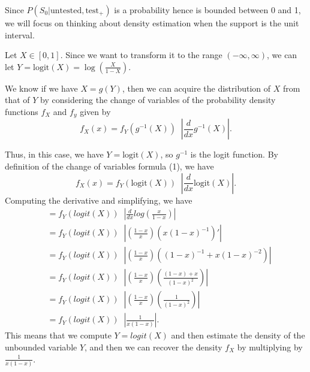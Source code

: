 \documentclass[12pt,twoside]{smiththesis}
\begin{document}
Since \(P(S_0|\text{untested}, \text{test}_+)\) is a probability hence is bounded between 0 and 1, we will focus on thinking about density estimation when the support is the unit interval.

Let \(X \in [0,1]\). Since we want to transform it to the range \((-\infty,\infty)\), we can let \(Y = \text{logit}(X) = \log \left( \frac{X}{1-X} \right)\).

We know if we have \(X = g(Y)\), then we can acquire the distribution of \(X\) from that of \(Y\) by considering the change of variables of the probability density functions \(f_X\) and \(f_y\) given by
\[f_X(x) = f_Y(g^{-1}(X)) \;\; \left| \frac{d}{dx} g^{-1}(X) \right|. \tag{1}\]

Thus, in this case, we have \(Y = \text{logit}(X)\), so \(g^{-1}\) is the logit function. By definition of the change of variables formula (1), we have
\[f_X(x) = f_Y(\text{logit}(X)) \;\; \left| \frac{d}{dx} \text{logit}(X) \right|.\]
Computing the derivative and simplifying, we have
\begin{align*} &= f_Y(logit(X)) \;\; \left| \frac{d}{dx}log(\frac{x}{1-x}) \right|\\
&= f_Y(logit(X)) \;\; \left| \left(\frac{1-x}{x} \right) (x(1-x)^{-1})' \right|\\ 
&= f_Y(logit(X)) \;\; \left| \left(\frac{1-x}{x} \right) ((1-x)^{-1} + x(1-x)^{-2} ) \right|\\
&= f_Y(logit(X)) \;\; \left| \left(\frac{1-x}{x} \right) \left(\frac{(1-x) + x }{ (1-x)^{2} }\right) \right|\\
&= f_Y(logit(X)) \;\; \left| \left(\frac{1-x}{x} \right) \left(\frac{1 }{ (1-x)^{2} }\right) \right|\\
&= f_Y(logit(X)) \;\; \left|  \frac{1 }{ x (1-x) } \right|.
\end{align*}
This means that we compute \(Y = logit(X)\) and then estimate the density of the unbounded variable \(Y\), and then we can recover the density \(f_X\) by multiplying by \(\frac{1 }{ x (1-x) }\).
\end{document}

